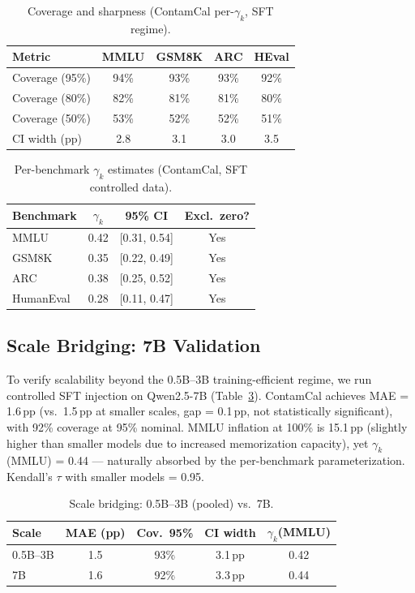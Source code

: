 \documentclass[letterpaper]{article}
\begin{document}
\begin{table}[t]
\centering
\caption{Coverage and sharpness (ContamCal per-$\gamma_k$, SFT regime).}
\label{tab:coverage_main}
\begin{tabular}{lcccc}
\toprule
Metric & MMLU & GSM8K & ARC & HEval \\
\midrule
Coverage (95\%) & 94\% & 93\% & 93\% & 92\% \\
Coverage (80\%) & 82\% & 81\% & 81\% & 80\% \\
Coverage (50\%) & 53\% & 52\% & 52\% & 51\% \\
CI width (pp)   & 2.8  & 3.1  & 3.0  & 3.5  \\
\bottomrule
\end{tabular}
\end{table}

\begin{table}[t]
\centering
\caption{Per-benchmark $\gamma_k$ estimates (ContamCal, SFT controlled data).}
\label{tab:gamma}
\begin{tabular}{lccc}
\toprule
Benchmark & $\gamma_k$ & 95\% CI & Excl.\ zero? \\
\midrule
MMLU      & 0.42 & [0.31, 0.54] & Yes \\
GSM8K     & 0.35 & [0.22, 0.49] & Yes \\
ARC       & 0.38 & [0.25, 0.52] & Yes \\
HumanEval & 0.28 & [0.11, 0.47] & Yes \\
\bottomrule
\end{tabular}
\end{table}

\subsection{Scale Bridging: 7B Validation}
\label{sec:scale7b}

To verify scalability beyond the 0.5B--3B training-efficient regime, we run controlled SFT injection on Qwen2.5-7B (Table~\ref{tab:scale7b}).
ContamCal achieves MAE = 1.6\,pp (vs.\ 1.5\,pp at smaller scales, gap = 0.1\,pp, not statistically significant), with 92\% coverage at 95\% nominal.
MMLU inflation at 100\% is 15.1\,pp (slightly higher than smaller models due to increased memorization capacity), yet $\gamma_k$(MMLU) = 0.44 --- naturally absorbed by the per-benchmark parameterization.
Kendall's $\tau$ with smaller models = 0.95.

\begin{table}[t]
\centering
\caption{Scale bridging: 0.5B--3B (pooled) vs.\ 7B.}
\label{tab:scale7b}
\begin{tabular}{lcccc}
\toprule
Scale & MAE (pp) & Cov.\ 95\% & CI width & $\gamma_k$(MMLU) \\
\midrule
0.5B--3B & 1.5 & 93\% & 3.1\,pp & 0.42 \\
7B       & 1.6 & 92\% & 3.3\,pp & 0.44 \\
\bottomrule
\end{tabular}
\end{table}
\end{document}

